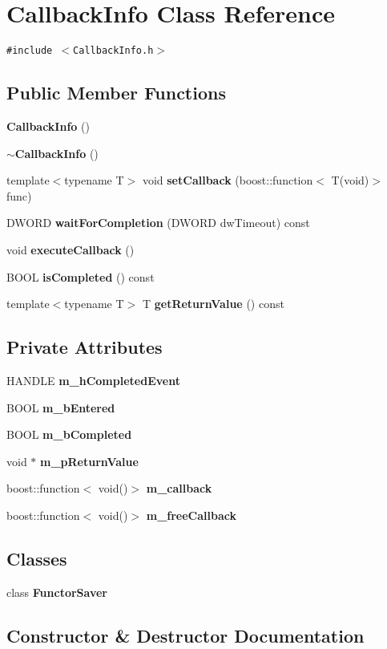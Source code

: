 \section{Callback\-Info Class Reference}
\label{class_callback_info}
{\tt \#include $<$Callback\-Info.h$>$}

\subsection*{Public Member Functions}
\begin{CompactItemize}
\item 
{\bf Callback\-Info} ()
\item 
{\bf $\sim$Callback\-Info} ()
\item 
template$<$typename T$>$ void {\bf set\-Callback} (boost::function$<$ T(void)$>$ func)
\item 
DWORD {\bf wait\-For\-Completion} (DWORD dw\-Timeout) const 
\item 
void {\bf execute\-Callback} ()
\item 
BOOL {\bf is\-Completed} () const
\item 
template$<$typename T$>$ T {\bf get\-Return\-Value} () const
\end{CompactItemize}
\subsection*{Private Attributes}
\begin{CompactItemize}
\item 
HANDLE {\bf m\_\-h\-Completed\-Event}
\item 
BOOL {\bf m\_\-b\-Entered}
\item 
BOOL {\bf m\_\-b\-Completed}
\item 
void $\ast$ {\bf m\_\-p\-Return\-Value}
\item 
boost::function$<$ void()$>$ {\bf m\_\-callback}
\item 
boost::function$<$ void()$>$ {\bf m\_\-free\-Callback}
\end{CompactItemize}
\subsection*{Classes}
\begin{CompactItemize}
\item 
class {\bf Functor\-Saver}
\end{CompactItemize}


\subsection{Constructor \& Destructor Documentation}
